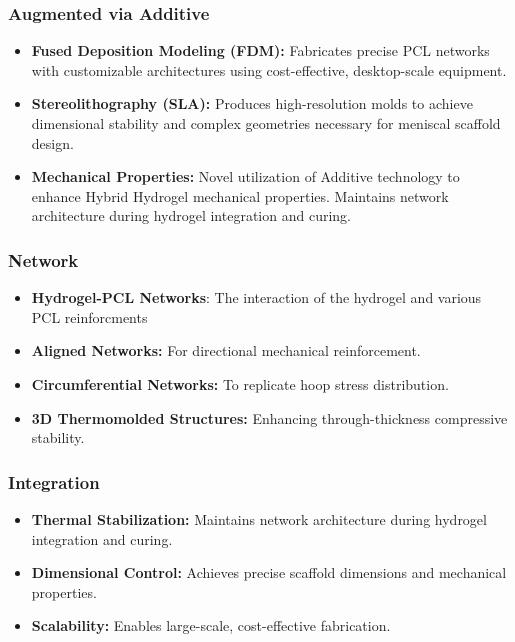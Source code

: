 \subsubsection{Augmented via Additive}

\begin{itemize}
    \item \textbf{Fused Deposition Modeling (FDM):} Fabricates precise PCL networks with customizable architectures using cost-effective, desktop-scale equipment.
    \item \textbf{Stereolithography (SLA):} Produces high-resolution molds to achieve dimensional stability and complex geometries necessary for meniscal scaffold design.
    \item \textbf{Mechanical Properties:} Novel utilization of Additive technology to enhance Hybrid Hydrogel mechanical properties.  Maintains network architecture during hydrogel integration and curing.
\end{itemize}

\subsubsection{Network}

\begin{itemize}
    \item \textbf{Hydrogel-PCL Networks}: The interaction of the hydrogel and various PCL reinforcments
    \item \textbf{Aligned Networks:} For directional mechanical reinforcement.
    \item \textbf{Circumferential Networks:} To replicate hoop stress distribution.
    \item \textbf{3D Thermomolded Structures:} Enhancing through-thickness compressive stability.
\end{itemize}

\subsubsection{Integration}

\begin{itemize}
    \item \textbf{Thermal Stabilization:} Maintains network architecture during hydrogel integration and curing.
    \item \textbf{Dimensional Control:} Achieves precise scaffold dimensions and mechanical properties.
    \item \textbf{Scalability:} Enables large-scale, cost-effective fabrication.
\end{itemize}

